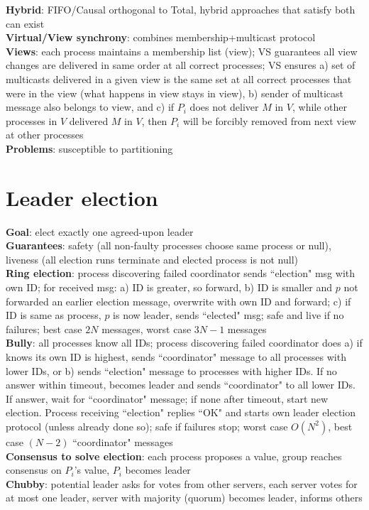 \documentclass{article}
\begin{document}
\begin{multicols*}{3}
\textbf{Hybrid}: FIFO/Causal orthogonal to Total, hybrid approaches that satisfy both can exist \\
\textbf{Virtual/View synchrony}: combines membership+multicast protocol \\
\textbf{Views}: each process maintains a membership list (view); VS guarantees all view changes are delivered in same order at all correct processes; VS ensures a) set of multicasts delivered in a given view is the same set at all correct processes that were in the view (what happens in view stays in view), b) sender of multicast message also belongs to view, and c) if $P_i$ does not deliver $M$ in $V$, while other processes in $V$ delivered $M$ in $V$, then $P_i$ will be forcibly removed from next view at other processes \\
\textbf{Problems}: susceptible to partitioning

\section{Leader election}
\textbf{Goal}: elect exactly one agreed-upon leader \\
\textbf{Guarantees}: safety (all non-faulty processes choose same process or null), liveness (all election runs terminate and elected process is not null) \\
\textbf{Ring election}: process discovering failed coordinator sends ``election" msg with own ID; for received msg: a) ID is greater, so forward, b) ID is smaller and $p$ not forwarded an earlier election message, overwrite with own ID and forward; c) if ID is same as process, $p$ is now leader, sends ``elected" msg; safe and live if no failures; best case $2N$ messages, worst case $3N-1$ messages \\
\textbf{Bully}: all processes know all IDs; process discovering failed coordinator does a) if knows its own ID is highest, sends ``coordinator" message to all processes with lower IDs, or b) sends ``election" message to processes with higher IDs. If no answer within timeout, becomes leader and sends ``coordinator" to all lower IDs. If answer, wait for ``coordinator" message; if none after timeout, start new election. Process receiving ``election" replies ``OK" and starts own leader election protocol (unless already done so); safe if failures stop; worst case $O(N^2)$, best case $(N-2)$ ``coordinator" messages \\
\textbf{Consensus to solve election}: each process proposes a value, group reaches consensus on $P_i$'s value, $P_i$ becomes leader \\
\textbf{Chubby}: potential leader asks for votes from other servers, each server votes for at most one leader, server with majority (quorum) becomes leader, informs others


\end{multicols*}
\end{document}
